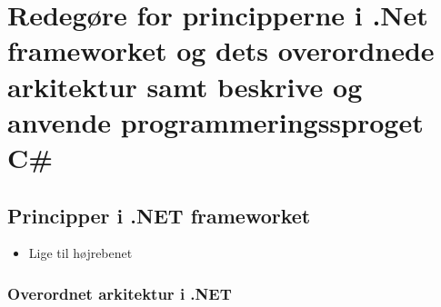 \section{Redegøre for principperne i .Net frameworket og dets overordnede arkitektur samt beskrive og anvende programmeringssproget C\#}

\subsection{Principper i .NET frameworket}

\begin{itemize}
	\item Lige til højrebenet
\end{itemize}

\subsubsection{Overordnet arkitektur i .NET}
